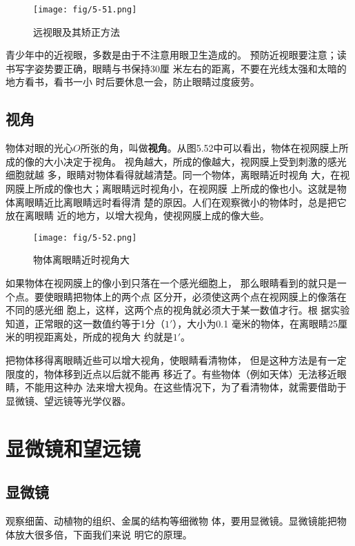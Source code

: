     \begin{figure}[htp]\centering
        \texttt{[image: fig/5-51.png]}
        \caption{远视眼及其矫正方法}
        \end{figure}

青少年中的近视眼，多数是由于不注意用眼卫生造成的。
预防近视眼要注意；读书写字姿势要正确，眼睛与书保持30厘
米左右的距离，不要在光线太强和太暗的地方看书，看书一小
时后要休息一会，防止眼睛过度疲劳。

\subsection{视角}

物体对眼的光心$O$所张的角，叫做\textbf{视角}。从图5.52中可以看出，物体在视网膜上所成的像的大小决定于视角。
视角越大，所成的像越大，视网膜上受到刺激的感光细胞就越
多，眼睛对物体看得就越清楚。同一个物体，离眼睛近时视角
大，在视网膜上所成的像也大；离眼睛远时视角小，在视网膜
上所成的像也小。这就是物体离眼睛近比离眼睛远时看得清
楚的原因。人们在观察微小的物体时，总是把它放在离眼睛
近的地方，以增大视角，使视网膜上成的像大些。

\begin{figure}[htp]\centering
    \texttt{[image: fig/5-52.png]}
    \caption{物体离眼睛近时视角大}
    \end{figure}

如果物体在视网膜上的像小到只落在一个感光细胞上，
那么眼睛看到的就只是一个点。要使眼睛把物体上的两个点
区分开，必须使这两个点在视网膜上的像落在不同的感光细
胞上，这样，这两个点的视角就必须大于某一数值才行。根
据实验知道，正常眼的这一数值约等于1分（$1'$），大小为0.1
毫米的物体，在离眼睛25厘米的明视距离处，所成的视角大
约就是$1'$。

把物体移得离眼睛近些可以增大视角，使眼睛看清物体，
但是这种方法是有一定限度的，物体移到近点以后就不能再
移近了。有些物体（例如天体）无法移近眼睛，不能用这种办
法来增大视角。在这些情况下，为了看清物体，就需要借助于
显微镜、望远镜等光学仪器。

\section{显微镜和望远镜}
\subsection{显微镜}

观察细菌、动植物的组织、金属的结构等细微物
体，要用显微镜。显微镜能把物体放大很多倍，下面我们来说
明它的原理。

